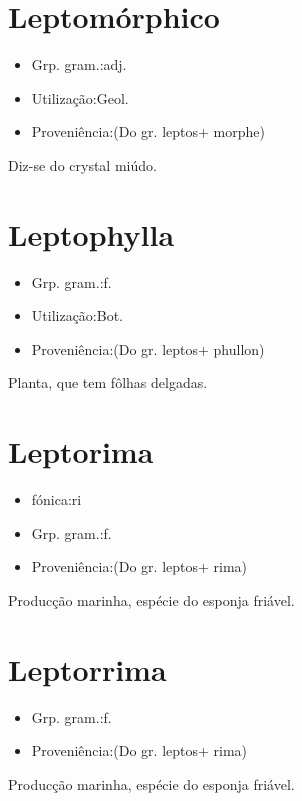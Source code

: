 \section{Leptomórphico}
\begin{itemize}
\item {Grp. gram.:adj.}
\end{itemize}
\begin{itemize}
\item {Utilização:Geol.}
\end{itemize}
\begin{itemize}
\item {Proveniência:(Do gr. \textunderscore leptos\textunderscore  + \textunderscore morphe\textunderscore )}
\end{itemize}
Diz-se do crystal miúdo.
\section{Leptophylla}
\begin{itemize}
\item {Grp. gram.:f.}
\end{itemize}
\begin{itemize}
\item {Utilização:Bot.}
\end{itemize}
\begin{itemize}
\item {Proveniência:(Do gr. \textunderscore leptos\textunderscore  + \textunderscore phullon\textunderscore )}
\end{itemize}
Planta, que tem fôlhas delgadas.
\section{Leptorima}
\begin{itemize}
\item {fónica:ri}
\end{itemize}
\begin{itemize}
\item {Grp. gram.:f.}
\end{itemize}
\begin{itemize}
\item {Proveniência:(Do gr. \textunderscore leptos\textunderscore  + \textunderscore rima\textunderscore )}
\end{itemize}
Producção marinha, espécie do esponja friável.
\section{Leptorrima}
\begin{itemize}
\item {Grp. gram.:f.}
\end{itemize}
\begin{itemize}
\item {Proveniência:(Do gr. \textunderscore leptos\textunderscore  + \textunderscore rima\textunderscore )}
\end{itemize}
Producção marinha, espécie do esponja friável.
